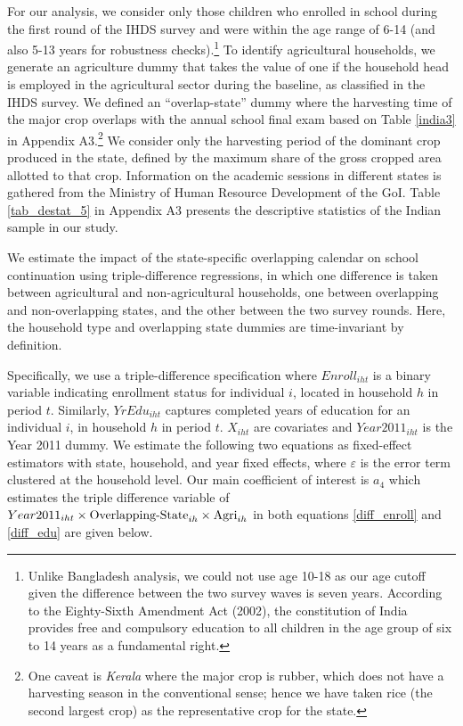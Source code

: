 \documentclass[12pt,letterpaper]{article}
\newcommand{\0}{\ensuremath{\mbox{\boldmath $0$}}}
\begin{document}
For our analysis, we consider only those children who enrolled in school during the first round of the IHDS survey and were within the age range of 6-14 (and also 5-13 years for robustness checks).\footnote{Unlike Bangladesh analysis, we could not use age 10-18 as our age cutoff given the difference between the two survey waves is seven years. According to the Eighty-Sixth Amendment Act (2002), the constitution of India provides free and compulsory education to all children in the age group of six to 14 years as a fundamental right.} To identify agricultural households, we generate an agriculture dummy that takes the value of one if the household head is employed in the agricultural sector during the baseline, as classified in the IHDS survey.  We defined an ``overlap-state'' dummy where the harvesting time of the major crop overlaps with the annual school final exam based on Table \ref{india3} in Appendix A3.\footnote{One caveat is \textit{Kerala} where the major crop is rubber, which does not have a harvesting season in the conventional sense; hence we have taken rice (the second largest crop) as the representative crop for the state.} We consider only the harvesting period of the dominant crop produced in the state, defined by the maximum share of the gross cropped area allotted to that crop. Information on the academic sessions in different states is gathered from the Ministry of Human Resource Development of the GoI. Table \ref{tab_destat_5} in Appendix A3 presents the descriptive statistics of the Indian sample in our study.

We estimate the impact of the state-specific overlapping calendar on school continuation using triple-difference regressions, in which one difference is taken between agricultural and non-agricultural households, one between overlapping and non-overlapping states, and the other between the two survey rounds. Here, the household type and overlapping state dummies are time-invariant by definition.

Specifically, we use a triple-difference specification where ${Enroll}_{iht}$ is a binary variable indicating enrollment status for individual $i$, located in household $h$ in period $t$. Similarly, ${YrEdu}_{iht}$ captures completed years of education for an individual $i$, in household $h$ in period $t$. ${X}_{iht}$ are covariates and ${Year2011}_{iht}$ is the Year 2011 dummy. We estimate the following two equations as fixed-effect estimators with state, household, and year fixed effects, where $\varepsilon$ is the error term clustered at the household level. Our main coefficient of interest is $a_4$ which estimates the triple difference variable of ${Year2011}_{iht}\times \textnormal{Overlapping-State}_{ih}\times\textnormal{Agri}_{ih}$ in both equations \ref{diff_enroll} and \ref{diff_edu} are given below.
\end{document}
